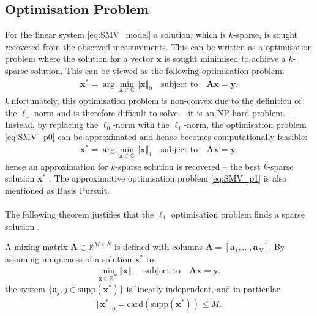 \subsection{Optimisation Problem}\label{sec:opti}
For the linear system \eqref{eq:SMV_model} a solution, which is $k$-sparse, is sought recovered from the observed measurements. This can be written as a optimisation problem where the solution for a vector $\mathbf{x}$ is sought minimised to achieve a $k$-sparse solution.
This can be viewed as the following optimisation problem:
\begin{align}\label{eq:SMV_p0}
\mathbf{x}^\ast = \arg \min_{\mathbf{x} \in \mathbb{C}} \Vert \mathbf{x} \Vert_0 \quad \text{subject to} \quad \mathbf{Ax} = \mathbf{y}.
\end{align}
Unfortunately, this optimisation problem is non-convex due to the definition of the $\ell_0$-norm and is therefore difficult to solve -- it is an NP-hard problem. 
Instead, by replacing the $\ell_0$-norm with the $\ell_1$-norm, the optimisation problem \eqref{eq:SMV_p0} can be approximated and hence becomes computationally feasible: 
\begin{align}\label{eq:SMV_p1}
\mathbf{x}^\ast = \arg \min_{\mathbf{x} \in \mathbb{C}} \Vert \mathbf{x} \Vert_1 \quad \text{subject to} \quad \mathbf{Ax} = \mathbf{y}.
\end{align} 
hence an approximation for $k$-sparse solution is recovered -- the best $k$-sparse solution $\mathbf{x}^\ast$ \cite[p. 27]{CS}. The approximative optimisation problem \eqref{eq:SMV_p1} is also mentioned as Basis Pursuit. 
\\ \\
The following theorem justifies that the $\ell_1$ optimisation problem finds a sparse solution \cite[p. 62-63]{FR}.
\begin{theorem}
A mixing matrix $\mathbf{A} \in \mathbb{R}^{M \times N}$ is defined with columns $\mathbf{A} = [\mathbf{a}_1, \dots, \mathbf{a}_N]$. 
By assuming uniqueness of a solution $\mathbf{x}^{\ast}$ to
\begin{align*}
\min_{\mathbf{x} \in \mathbb{R}^N} \Vert \mathbf{x} \Vert_1 \quad \text{subject to} \quad \mathbf{Ax} = \mathbf{y},
\end{align*}
the system $\lbrace \mathbf{a}_j, j \in \text{supp}( \mathbf{x}^\ast) \rbrace$ is linearly independent, and in particular
\begin{align*}
\Vert \mathbf{x}^\ast \Vert_0 = \text{card}(\text{supp} (\mathbf{x}^\ast)) \leq M.
\end{align*}
\end{theorem}
